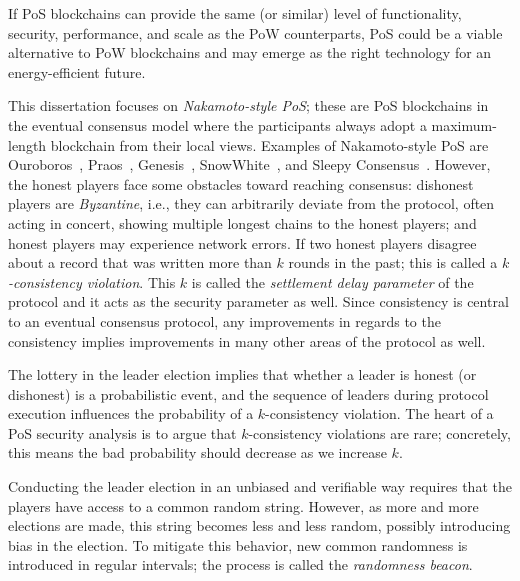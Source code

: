 If PoS blockchains can provide the same (or similar) level of 
functionality, security, performance, and scale as the PoW counterparts, 
PoS could be a viable alternative to PoW blockchains 
and may emerge as the right technology for an energy-efficient future.



This dissertation focuses on \emph{Nakamoto-style PoS}; 
these are PoS blockchains in the eventual consensus model where the participants 
always adopt a maximum-length blockchain from their local views. 
Examples of Nakamoto-style PoS are Ouroboros~\cite{Ouroboros}, Praos~\cite{Praos}, 
Genesis~\cite{Genesis}, SnowWhite~\cite{SnowWhite}, 
and Sleepy Consensus~\cite{Sleepy}.
However, the honest players face some obstacles toward reaching consensus: 
dishonest players are \emph{Byzantine}, i.e., 
they can arbitrarily deviate from the protocol, 
often acting in concert, 
showing multiple longest chains to the honest players;
and honest players may experience network errors. 
If two honest players disagree about a record that was 
written more than $k$ rounds in the past;
this is called a \emph{$k$-consistency violation}. 
This $k$ is called the \emph{settlement delay parameter} of the protocol
and it acts as the security parameter as well.
Since consistency is central to an eventual consensus protocol, 
any improvements in regards to the consistency implies 
improvements in many other areas of the protocol as well.


The lottery in the leader election implies that 
whether a leader is honest (or dishonest) is a probabilistic event, 
and the sequence of leaders during protocol execution 
influences the probability of a $k$-consistency violation.
The heart of a PoS security analysis is to argue that $k$-consistency violations are rare; 
concretely, this means the bad probability should decrease as we increase $k$. 



Conducting the leader election in an unbiased and verifiable way 
requires that the players have access to a common random string. 
However, as more and more elections are made, 
this string becomes less and less random, possibly introducing bias in the election. 
To mitigate this behavior, 
new common randomness is introduced in regular intervals; 
the process is called the \emph{randomness beacon}.

